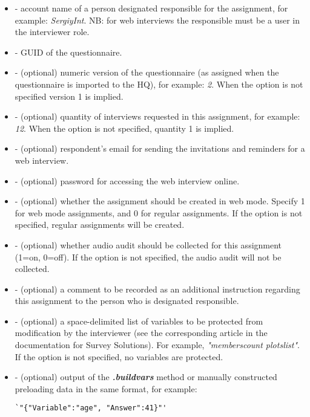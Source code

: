 \optsheader
\begin{itemize}

\item {} - account name of a person designated responsible
for the assignment, for example: \textit{SergiyInt}. NB: for web interviews the
responsible must be a user in the interviewer role.

\item {} - GUID of the questionnaire.

\item {} - (optional) numeric version of the questionnaire
      (as assigned when the questionnaire is imported to the HQ), for example:
      \textit{2}. When the option is not specified version 1 is implied.

\item {} - (optional) quantity of interviews requested in
      this assignment, for example: \textit{12}. When the option is not
      specified, quantity 1 is implied.

\item {} - (optional) respondent's email for sending the
      invitations and reminders for a web interview.

\item {} - (optional) password for accessing the web interview
      online.

\item {} - (optional) whether the assignment should be
      created in web mode. Specify 1 for web mode assignments, and 0 for regular
      assignments. If the option is not specified, regular assignments will be
      created.

\item {} - (optional) whether audio audit should be collected for
      this assignment (1=on, 0=off). If the option is not specified, the audio
      audit will not be collected.

\item {} - (optional) a comment to be recorded as an additional
      instruction regarding this assignment to the person who is designated
      responsible.

\item {} - (optional) a space-delimited list of variables to
      be protected from modification by the interviewer (see the corresponding
      article in the documentation for Survey Solutions). For example,
      \textit{"memberscount plotslist"}. If the option is not specified, no
      variables are protected.

\item {} - (optional) output of the \textit{\textbf{.buildvars}}
      method or manually constructed preloading data in the same format, for
      example:
      \begin{lstlisting}[style=CommandLineStyle]
        `"{"Variable":"age", "Answer":41}"'
      \end{lstlisting}

\end{itemize}


